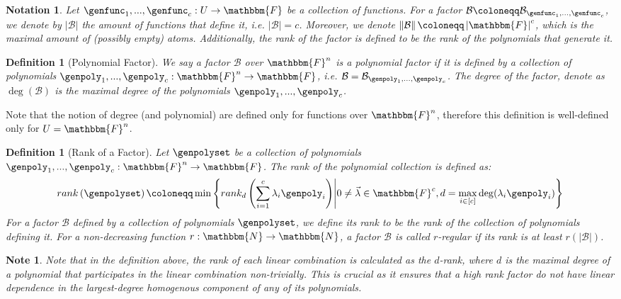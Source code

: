 \documentclass[10pt,a4paper]{article}
\newtheorem{definition}[theorem]{Definition}
\newtheorem*{notation*}{Notation}
\newtheorem*{note*}{Note}
\newcommand{\definedas}[0]{\coloneqq}
\newcommand{\parens}[1]{\left( #1 \right)}
\newcommand{\sparens}[1]{\left[ #1 \right]}
\newcommand{\set}[1]{\left\{ #1 \right\}}
\newcommand{\suchthat}[0]{\middle|}
\newcommand{\basefield}[0]{\mathbbm{F}}
\newcommand{\blocklength}[0]{n}
\newcommand{\field}[0]{\basefield^{\blocklength}}
\newcommand{\degree}[0]{d}
\newcommand{\funcdef}[3]{#1:#2\rightarrow#3}
\newcommand{\factor}[0]{\mathcal{B}}
\newcommand{\naturalnumbersset}[0]{\mathbbm{N}}
\newcommand{\rank}[1]{rank \parens{#1}}
\newcommand{\drank}[2]{rank_{#1} \parens{#2}}
\newcommand{\rankfunc}[0]{{{{r}}}}
\newcommand{\norm}[1]{\left\lVert{#1}\right\rVert}
\newcommand{\abs}[1]{\left| #1 \right|}
\begin{document}
\begin{notation*}
    Let $\funcdef{\genfunc_1,...,\genfunc_c}{U}{\basefield}$ be a collection of functions.
    For a factor $\factor \definedas \factor_{\genfunc_1,...,\genfunc_c}$, we denote by $\abs{\factor}$ the amount of functions that define it, i.e. $\abs{\factor} = c$.
    Moreover, we denote $\norm{\factor} \definedas \abs{\basefield}^c$, which is the maximal amount of (possibly empty) atoms.
    Additionally, the rank of the factor is defined to be the rank of the polynomials that generate it.
\end{notation*}
\begin{definition}[Polynomial Factor]
    We say a factor $\factor$ over $\field$ is a \emph{polynomial factor} if it is defined by a collection of polynomials $\funcdef{\genpoly_1,...,\genpoly_c}{\field}{\basefield}$,
    i.e. $\factor = \factor_{\genpoly_1,...,\genpoly_c}$.
    The degree of the factor, denote as $\deg(\factor)$ is the maximal degree of the polynomials $\genpoly_1,...,\genpoly_c$.
\end{definition}
Note that the notion of degree (and polynomial) are defined only for functions over $\field$,
therefore this definition is well-defined only for $U = \field$.

\begin{definition}[Rank of a Factor]\label{definition:factor-rank}
    Let $\genpolyset$ be a collection of polynomials $\funcdef{\genpoly_1,...,\genpoly_c}{\field}{\basefield}$.
    The rank of the polynomial collection is defined as:
    \[
        \rank{\genpolyset} \definedas \min \set{\drank{\degree}{\sum_{i=1}^c{\lambda_i \genpoly_i}} \suchthat 0 \neq \vec{\lambda} \in \basefield^c, \degree = \max_{i\in\sparens{c}}{\deg(\lambda_i \genpoly_i)}}
    \]
    For a factor $\factor$ defined by a collection of polynomials $\genpolyset$, we define its rank to be the rank of the collection of polynomials defining it.
    For a non-decreasing function $\funcdef{\rankfunc}{\naturalnumbersset}{\naturalnumbersset}$, a factor $\factor$ is called $\rankfunc$-regular if its rank is at least $\rankfunc(\abs{\factor})$.
\end{definition}
\begin{note*}
    Note that in the definition above, the rank of each linear combination is calculated as the $\degree$-rank,
    where $\degree$ is the maximal degree of a polynomial that participates in the linear combination non-trivially.
    This is crucial as it ensures that a high rank factor do not have linear dependence in the largest-degree homogenous component of any of its polynomials.
\end{note*}
\end{document}
